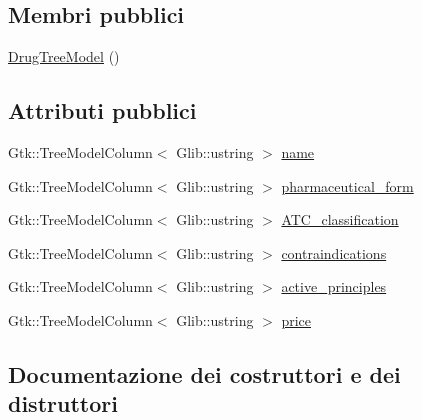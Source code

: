 \subsection*{Membri pubblici}
\begin{DoxyCompactItemize}
\item 
\mbox{\hyperlink{structmm_1_1model_1_1_drug_tree_model_a4fe945eeb529bbd8d3f19aa7797764d9}{Drug\+Tree\+Model}} ()
\end{DoxyCompactItemize}
\subsection*{Attributi pubblici}
\begin{DoxyCompactItemize}
\item 
Gtk\+::\+Tree\+Model\+Column$<$ Glib\+::ustring $>$ \mbox{\hyperlink{structmm_1_1model_1_1_drug_tree_model_aae1c93a96cd321861445996965814405}{name}}
\item 
Gtk\+::\+Tree\+Model\+Column$<$ Glib\+::ustring $>$ \mbox{\hyperlink{structmm_1_1model_1_1_drug_tree_model_aa93ee13951feb310e5b31775ebf74609}{pharmaceutical\+\_\+form}}
\item 
Gtk\+::\+Tree\+Model\+Column$<$ Glib\+::ustring $>$ \mbox{\hyperlink{structmm_1_1model_1_1_drug_tree_model_a0462c8a43912e7d9b24d302899c73ddd}{A\+T\+C\+\_\+classification}}
\item 
Gtk\+::\+Tree\+Model\+Column$<$ Glib\+::ustring $>$ \mbox{\hyperlink{structmm_1_1model_1_1_drug_tree_model_a6c23e14f0c72622e29de9a8d2534dbdd}{contraindications}}
\item 
Gtk\+::\+Tree\+Model\+Column$<$ Glib\+::ustring $>$ \mbox{\hyperlink{structmm_1_1model_1_1_drug_tree_model_aa4e0565da99c9e2e41dc8ed416c66903}{active\+\_\+principles}}
\item 
Gtk\+::\+Tree\+Model\+Column$<$ Glib\+::ustring $>$ \mbox{\hyperlink{structmm_1_1model_1_1_drug_tree_model_a19f5c8676ecd88d4bb8b6f5d161d8a6b}{price}}
\end{DoxyCompactItemize}


\subsection{Documentazione dei costruttori e dei distruttori}
\mbox{\label{structmm_1_1model_1_1_drug_tree_model_a4fe945eeb529bbd8d3f19aa7797764d9}} 
